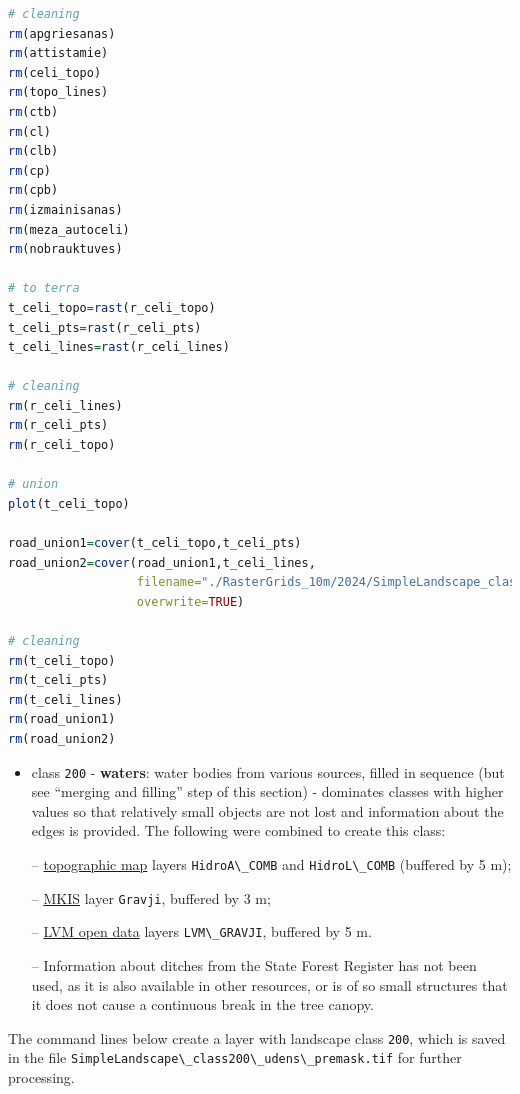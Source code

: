 \documentclass[
]{book}
\newcommand{\passthrough}[1]{#1}
\begin{document}
\begin{lstlisting}[language=R]
# cleaning
rm(apgriesanas)
rm(attistamie)
rm(celi_topo)
rm(topo_lines)
rm(ctb)
rm(cl)
rm(clb)
rm(cp)
rm(cpb)
rm(izmainisanas)
rm(meza_autoceli)
rm(nobrauktuves)

# to terra
t_celi_topo=rast(r_celi_topo)
t_celi_pts=rast(r_celi_pts)
t_celi_lines=rast(r_celi_lines)

# cleaning
rm(r_celi_lines)
rm(r_celi_pts)
rm(r_celi_topo)

# union
plot(t_celi_topo)

road_union1=cover(t_celi_topo,t_celi_pts)
road_union2=cover(road_union1,t_celi_lines,
                  filename="./RasterGrids_10m/2024/SimpleLandscape_class100_celi.tif",
                  overwrite=TRUE)

# cleaning
rm(t_celi_topo)
rm(t_celi_pts)
rm(t_celi_lines)
rm(road_union1)
rm(road_union2)
\end{lstlisting}

\begin{itemize}
\item
  class \passthrough{\lstinline!200!} - \textbf{waters}: water bodies from various sources, filled in
  sequence (but see ``merging and filling'' step of this section) - dominates classes
  with higher values so that relatively small objects are not lost and information
  about the edges is provided. The following were combined to create this class:

  -- \hyperref[Ch04.04]{topographic map} layers \passthrough{\lstinline!HidroA\_COMB!} and \passthrough{\lstinline!HidroL\_COMB!} (buffered by 5 m);

  -- \hyperref[Ch04.03]{MKIS} layer \passthrough{\lstinline!Gravji!}, buffered by 3 m;

  -- \hyperref[Ch04.06]{LVM open data} layers \passthrough{\lstinline!LVM\_GRAVJI!}, buffered by 5 m.

  -- Information about ditches from the State Forest Register has not been used,
  as it is also available in other resources, or is of so small structures that it does
  not cause a continuous break in the tree canopy.
\end{itemize}

The command lines below create a layer with landscape class \passthrough{\lstinline!200!}, which is
saved in the file \passthrough{\lstinline!SimpleLandscape\_class200\_udens\_premask.tif!} for further processing.
\end{document}
